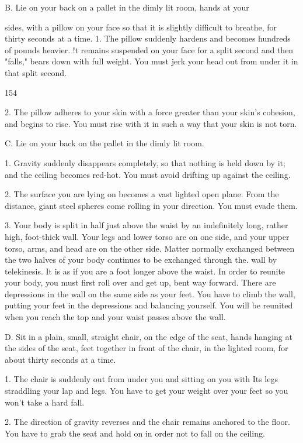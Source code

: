 \documentclass[10pt,twoside]{memoir}
\begin{document}
\begin{enumerate}
{\begin{enumerate}
\begin{sysrules}
\begin{sysrules}
\begin{sysrules}
\begin{sysrules}
B. Lie on your back on a pallet in the dimly lit room, hands at your 

sides, with a pillow on your face so that it is slightly difficult to breathe, for 
thirty seconds at a time. 
1. The pillow suddenly hardens and becomes hundreds of pounds heavier. !t 
remains suspended on your face for a split second and then "falls," bears 
down with full weight. You must jerk your head out from under it in that 
split second. 


154 


2. The pillow adheres to your skin with a force greater than your skin's 
cohesion, and begins to rise. You must rise with it in such a way that your 
skin is not torn. 

C. Lie on your back on the pallet in the dimly lit room. 

1. Gravity suddenly disappears completely, so that nothing is held down by 
it; and the ceiling becomes red-hot. You must avoid drifting up against the 
ceiling. 

2. The surface you are lying on becomes a vast lighted open plane. From the 
distance, giant steel spheres come rolling in your direction. You must evade 
them. 

3. Your body is split in half just above the waist by an indefinitely long, 
rather high, foot-thick wall. Your legs and lower torso are on one side, and 
your upper torso, arms, and head are on the other side. Matter normally 
exchanged between the two halves of your body continues to be exchanged 
through the. wall by telekinesis. It is as if you are a foot longer above the 
waist. In order to reunite your body, you must first roll over and get up, 
bent way forward. There are depressions in the wall on the same side as your 
feet. You have to climb the wall, putting your feet in the depressions and 
balancing yourself. You will be reunited when you reach the top and your 
waist passes above the wall. 

D. Sit in a plain, small, straight chair, on the edge of the seat, hands 
hanging at the sides of the seat, feet together in front of the chair, in the 
lighted room, for about thirty seconds at a time. 

1. The chair is suddenly out from under you and sitting on you with Its legs 
straddling your lap and legs. You have to get your weight over your feet so 
you won't take a hard fall. 

2. The direction of gravity reverses and the chair remains anchored to the 
floor. You have to grab the seat and hold on in order not to fall on the 
ceiling. 


\end{sysrules}
\end{sysrules}
\end{sysrules}
\end{sysrules}
\end{enumerate}}
\end{enumerate}
\end{document}
